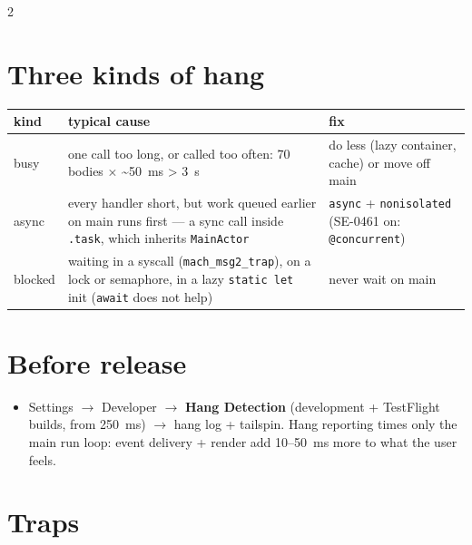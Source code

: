 \documentclass[8pt]{extarticle}
\begin{document}
\begin{multicols}{2}
\section{Three kinds of hang}
{\footnotesize\setlength{\tabcolsep}{3pt}
\begin{tabular}{@{}>{\raggedright\arraybackslash}p{0.95cm}>{\raggedright\arraybackslash}p{4.3cm}>{\raggedright\arraybackslash}p{2.3cm}@{}}
\toprule
\textbf{kind} & \textbf{typical cause} & \textbf{fix} \\
\midrule
busy & one call too long, or called too often: 70 bodies × \textasciitilde50~ms > 3~s & do less
(lazy container, cache) or move off main \\
async & every handler short, but work queued earlier on main runs first — a sync call inside
\texttt{.task}, which inherits \texttt{MainActor} & \texttt{async} + \texttt{nonisolated}
(SE-0461 on: \texttt{@concurrent}) \\
blocked & waiting in a syscall (\texttt{mach\_msg2\_trap}), on a lock or semaphore, in a lazy
\texttt{static let} init (\texttt{await} does not help) & never wait on main \\
\bottomrule
\end{tabular}}

\section{Before release}
\begin{itemize}
  \item Settings $\to$ Developer $\to$ \textbf{Hang Detection} (development + TestFlight builds,
        from 250~ms) $\to$ hang log + tailspin. Hang reporting times only the main run
        loop: event delivery + render add 10--50~ms more to what the user feels.
\end{itemize}

\section{Traps}
\begin{itemize}
\end{itemize}

\end{multicols}

\end{document}
